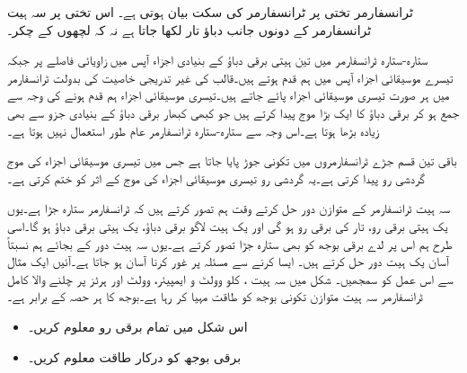 ٹرانسفارمر  تختی پر ٹرانسفارمر کی سکت بیان ہوتی ہے۔ اس تختی پر سہ ہیت ٹرانسفارمر کے دونوں جانب  دباؤ تار  لکھا جاتا ہے  نہ کہ لچھوں کے چکر۔

ستارہ-ستارہ ٹرانسفارمر میں تین ہیتی برقی دباؤ  کے بنیادی اجزاء آپس میں   زاویائی فاصلے پر جبکہ  تیسرے موسیقائی اجزاء آپس میں ہم قدم ہوتے ہیں۔قالب کی غیر تدریجی خاصیت کی بدولت ٹرانسفارمر میں ہر صورت تیسری موسیقائی اجزاء پائے جاتے ہیں۔تیسری موسیقائی اجزاء ہم قدم ہونے کی وجہ سے جمع ہو کر  برقی دباؤ کا ایک بڑا موج پیدا کرتے ہیں جو کبھی کبھار برقی دباؤ کے بنیادی جزو سے بھی زیادہ بڑھا ہوتا ہے۔اس وجہ سے ستارہ-ستارہ  ٹرانسفارمر عام طور استعمال نہیں ہوتا ہے۔

باقی تین قسم جڑے ٹرانسفارمروں میں تکونی جوڑ پایا جاتا ہے جس میں تیسری موسیقائی اجزاء کی موج گردشی رو پیدا کرتی ہے۔یہ گردشی رو تیسری موسیقائی اجزاء کی موج کے اثر کو ختم کرتی  ہے۔



سہ ہیت ٹرانسفارمر کے متوازن دور حل کرتے وقت ہم تصور کرتے ہیں کہ ٹرانسفارمر ستارہ جڑا  ہے۔یوں یک ہیتی برقی رو، تار  کی  برقی رو ہو گی  اور یک ہیت لاگو برقی دباؤ، یک ہیتی برقی دباؤ  ہو گا۔اسی طرح ہم اس پر لدے برقی بوجھ کو بھی ستارہ جڑا تصور کرتے ہے۔یوں سہ ہیت دور کے بجائے  ہم نسبتاً آسان یک ہیت دور حل کرتے ہیں۔ ایسا کرنے سے مسئلہ پر غور کرنا آسان ہو جاتا ہے۔آئیں ایک مثال سے اس عمل کو  سمجھیں۔
%
شکل   میں سہ ہیت ،    کلو وولٹ و ایمپیئر،    وولٹ اور  ہرٹز پر چلنے والا کامل ٹرانسفارمر سہ ہیت متوازن تکونی بوجھ کو طاقت مہیا کر رہا ہے۔بوجھ کا ہر حصہ  کے برابر ہے۔
\begin{itemize}
\item
اس شکل میں تمام برقی رو معلوم کریں۔
\item
برقی بوجھ کو درکار طاقت معلوم کریں۔
\end{itemize}

